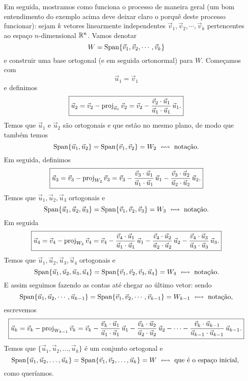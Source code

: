 \documentclass[../livro.tex]{subfiles}  %
\begin{document}
Em seguida, mostramos como funciona o processo de maneira geral (um bom entendimento do exemplo acima deve deixar claro o porquê deste processo funcionar): sejam $k$ vetores linearmente independentes $\vec{v}_1, \vec{v}_2, \cdots, \vec{v}_k$ pertencentes ao espaço $n$-dimensional $\mathbb{R}^n$. Vamos denotar
\[
W = \operatorname{Span} \{\vec{v}_1, \vec{v}_2, \cdots, \vec{v}_k\}
\] e construir uma base ortogonal (e em seguida ortonormal) para $W$. Começamos com
\[
\boxed{\vec{u}_1 = \vec{v}_1}
\] e definimos
\begin{equation}\label{eqn:Gram-Schmidt-1}
\boxed{\vec{u}_2 = \vec{v}_2 - \operatorname{proj}_{\vec{u}_1} \vec{v}_2 = \vec{v}_2 - \frac{\vec{v}_2 \cdot \vec{u}_1}{\vec{u}_1 \cdot \vec{u}_1} \, \vec{u}_1.}
\end{equation}
 Temos que $\vec{u}_1$ e $\vec{u}_2$ são ortogonais e que estão no mesmo plano, de modo que também temos
\[
\operatorname{Span} \{ \vec{u}_1, \vec{u}_2 \} = \operatorname{Span} \{ \vec{v}_1, \vec{v}_2 \} = W_2 \ \leftrightsquigarrow \text{ notação.}
\] Em seguida, definimos
\begin{equation}\label{eqn:Gram-Schmidt-2}
\boxed{\vec{u}_3 = \vec{v}_3 - \operatorname{proj}_{W_2} \vec{v}_3 = \vec{v}_3 - \frac{\vec{v}_3 \cdot \vec{u}_1}{\vec{u}_1 \cdot \vec{u}_1} \, \vec{u}_1 - \frac{\vec{v}_3 \cdot \vec{u}_2}{\vec{u}_2 \cdot \vec{u}_2} \, \vec{u}_2.}
\end{equation} Temos que $\vec{u}_1, \vec{u}_2, \vec{u}_3$ ortogonais e
\[
\Span \{ \vec{u}_1, \vec{u}_2, \vec{u}_3 \} = \Span \{ \vec{v}_1, \vec{v}_2, \vec{v}_3 \} = W_3 \ \leftrightsquigarrow \text{ notação.}
\] Em seguida
\[
\boxed{\vec{u}_4 = \vec{v}_4 - \operatorname{proj}_{W_3} \vec{v}_4 = \vec{v}_4 - \frac{\vec{v}_4 \cdot \vec{u}_1}{\vec{u}_1 \cdot \vec{u}_1} \, \vec{u}_1 - \frac{\vec{v}_4 \cdot \vec{u}_2}{\vec{u}_2 \cdot \vec{u}_2} \, \vec{u}_2 - \frac{\vec{v}_4 \cdot \vec{u}_3}{\vec{u}_3 \cdot \vec{u}_3} \, \vec{u}_3.}
\] Temos que $\vec{u}_1, \vec{u}_2, \vec{u}_3, \vec{u}_4$ ortogonais e
\[
\operatorname{Span} \{ \vec{u}_1, \vec{u}_2, \vec{u}_3, \vec{u}_4 \} = \operatorname{Span} \{ \vec{v}_1, \vec{v}_2, \vec{v}_3, \vec{u}_4 \} = W_4 \ \leftrightsquigarrow \text{ notação.}
\] E assim seguimos fazendo as contas até chegar ao último vetor: sendo
\[
\operatorname{Span} \{ \vec{u}_1, \vec{u}_2, \cdots, \vec{u}_{k-1} \} = \operatorname{Span} \{ \vec{v}_1, \vec{v}_2, \cdots, \vec{v}_{k-1} \} = W_{k-1} \ \leftrightsquigarrow \text{ notação,}
\] escrevemos
\[
\boxed{\vec{u}_k = \vec{v}_k - \operatorname{proj}_{W_{k-1}} \vec{v}_k = \vec{v}_k - \frac{\vec{v}_k \cdot \vec{u}_1}{\vec{u}_1 \cdot \vec{u}_1} \, \vec{u}_1 - \frac{\vec{v}_k \cdot \vec{u}_2}{\vec{u}_2 \cdot \vec{u}_2} \, \vec{u}_2 - \cdots - \frac{\vec{v}_k \cdot \vec{u}_{k-1}}{\vec{u}_{k-1} \cdot \vec{u}_{k-1}} \, \vec{u}_{k-1}.}
\] Temos que $\{\vec{u}_1, \vec{u}_2, \dots, \vec{u}_k\}$ é um conjunto ortogonal e
\[
\operatorname{Span} \{ \vec{u}_1, \vec{u}_2, \dots, \vec{u}_k \} = \operatorname{Span} \{ \vec{v}_1, \vec{v}_2, \dots, \vec{u}_k \} = W \ \leftrightsquigarrow \text{ que é o espaço inicial, }
\] como queríamos.
\end{document}

